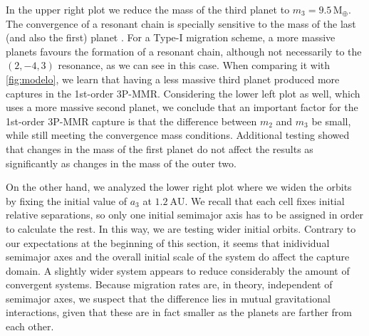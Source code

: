 \documentclass[baaa]{baaa}
\begin{document}
In the upper right plot we reduce the mass of the third planet to $m_3=9.5\,\mathrm{M_\oplus}$.
The convergence of a resonant chain is specially sensitive to the mass of the last (and also the first) planet \citep{beauge.cerioni.2022}.
For a Type-I migration scheme, a more massive planets favours the formation of a resonant chain, although not necessarily to the $(2,-4,3)$ resonance, as we can see in this case.
When comparing it with \ref{fig:modelo}, we learn that having a less massive third planet produced more captures in the 1st-order 3P-MMR.
Considering the lower left plot as well, which uses a more massive second planet, we conclude that an important factor for the 1st-order 3P-MMR capture is that the difference between $m_2$ and $m_3$ be small, while still meeting the convergence mass conditions.
Additional testing showed that changes in the mass of the first planet do not affect the results as significantly as changes in the mass of the outer two.



On the other hand, we analyzed the lower right plot where we widen the orbits by fixing the initial value of $a_3$ at $1.2~\mathrm{AU}$.
We recall that each cell fixes initial relative separations, so only one initial semimajor axis has to be assigned in order to calculate the rest.
In this way, we are testing wider initial orbits.
Contrary to our expectations at the beginning of this section, it seems that inidividual semimajor axes and the overall initial scale of the system do affect the capture domain.
A slightly wider system appears to reduce considerably the amount of convergent systems.
Because migration rates are, in theory, independent of semimajor axes, we suspect that the difference lies in mutual gravitational interactions, given that these are in fact smaller as the planets are farther from each other.
\end{document}
